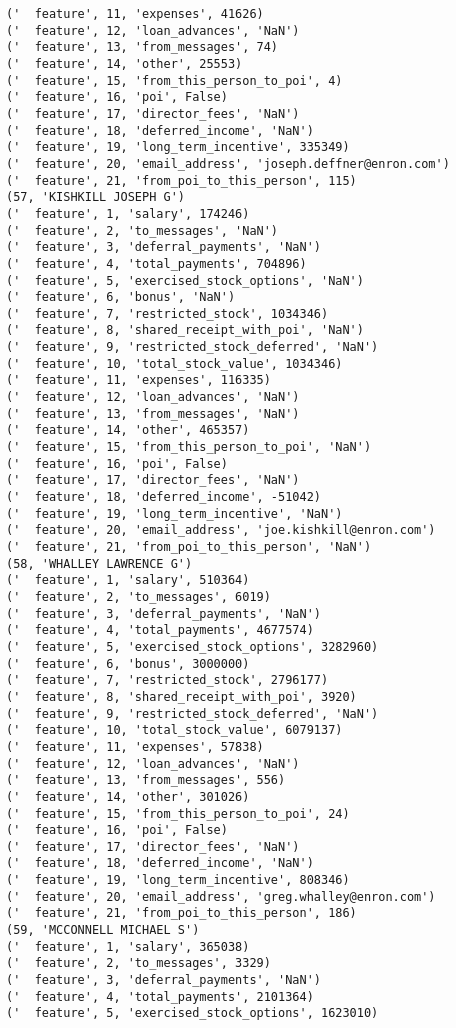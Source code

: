 \begin{verbatim}
('  feature', 11, 'expenses', 41626)
('  feature', 12, 'loan_advances', 'NaN')
('  feature', 13, 'from_messages', 74)
('  feature', 14, 'other', 25553)
('  feature', 15, 'from_this_person_to_poi', 4)
('  feature', 16, 'poi', False)
('  feature', 17, 'director_fees', 'NaN')
('  feature', 18, 'deferred_income', 'NaN')
('  feature', 19, 'long_term_incentive', 335349)
('  feature', 20, 'email_address', 'joseph.deffner@enron.com')
('  feature', 21, 'from_poi_to_this_person', 115)
(57, 'KISHKILL JOSEPH G')
('  feature', 1, 'salary', 174246)
('  feature', 2, 'to_messages', 'NaN')
('  feature', 3, 'deferral_payments', 'NaN')
('  feature', 4, 'total_payments', 704896)
('  feature', 5, 'exercised_stock_options', 'NaN')
('  feature', 6, 'bonus', 'NaN')
('  feature', 7, 'restricted_stock', 1034346)
('  feature', 8, 'shared_receipt_with_poi', 'NaN')
('  feature', 9, 'restricted_stock_deferred', 'NaN')
('  feature', 10, 'total_stock_value', 1034346)
('  feature', 11, 'expenses', 116335)
('  feature', 12, 'loan_advances', 'NaN')
('  feature', 13, 'from_messages', 'NaN')
('  feature', 14, 'other', 465357)
('  feature', 15, 'from_this_person_to_poi', 'NaN')
('  feature', 16, 'poi', False)
('  feature', 17, 'director_fees', 'NaN')
('  feature', 18, 'deferred_income', -51042)
('  feature', 19, 'long_term_incentive', 'NaN')
('  feature', 20, 'email_address', 'joe.kishkill@enron.com')
('  feature', 21, 'from_poi_to_this_person', 'NaN')
(58, 'WHALLEY LAWRENCE G')
('  feature', 1, 'salary', 510364)
('  feature', 2, 'to_messages', 6019)
('  feature', 3, 'deferral_payments', 'NaN')
('  feature', 4, 'total_payments', 4677574)
('  feature', 5, 'exercised_stock_options', 3282960)
('  feature', 6, 'bonus', 3000000)
('  feature', 7, 'restricted_stock', 2796177)
('  feature', 8, 'shared_receipt_with_poi', 3920)
('  feature', 9, 'restricted_stock_deferred', 'NaN')
('  feature', 10, 'total_stock_value', 6079137)
('  feature', 11, 'expenses', 57838)
('  feature', 12, 'loan_advances', 'NaN')
('  feature', 13, 'from_messages', 556)
('  feature', 14, 'other', 301026)
('  feature', 15, 'from_this_person_to_poi', 24)
('  feature', 16, 'poi', False)
('  feature', 17, 'director_fees', 'NaN')
('  feature', 18, 'deferred_income', 'NaN')
('  feature', 19, 'long_term_incentive', 808346)
('  feature', 20, 'email_address', 'greg.whalley@enron.com')
('  feature', 21, 'from_poi_to_this_person', 186)
(59, 'MCCONNELL MICHAEL S')
('  feature', 1, 'salary', 365038)
('  feature', 2, 'to_messages', 3329)
('  feature', 3, 'deferral_payments', 'NaN')
('  feature', 4, 'total_payments', 2101364)
('  feature', 5, 'exercised_stock_options', 1623010)

\end{verbatim}
